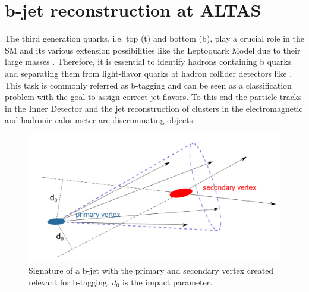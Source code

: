 \section{b-jet reconstruction at ALTAS}\label{btagging}
The third generation quarks, i.e. top (t) and bottom (b), play a crucial role in the SM and its various extension possibilities like the Leptoquark Model due to their large masses \cite{Hansson}. Therefore, it is essential to identify hadrons containing b quarks and separating them from light-flavor quarks at hadron collider detectors like {\ATLAS}. This task is commonly referred as b-tagging and can be seen as a classification problem with the goal to assign correct jet flavors. To this end the particle tracks in the Inner Detector and the jet reconstruction of clusters in the electromagnetic and hadronic calorimeter are discriminating objects. \cite{Paganini}\par
%
\begin{figure}[htbp]                                 
 \begin{center}                                       
  \includegraphics[width=0.55\linewidth]{figures/btagged.pdf} 
   \caption[Tracks in a b-jet.]{Signature of a b-jet with the primary and secondary vertex created relevant for b-tagging. $d_0$ is the impact parameter. \cite{Hansson}}
  \label{btagged}                                    
 \end{center}
\end{figure}
%
